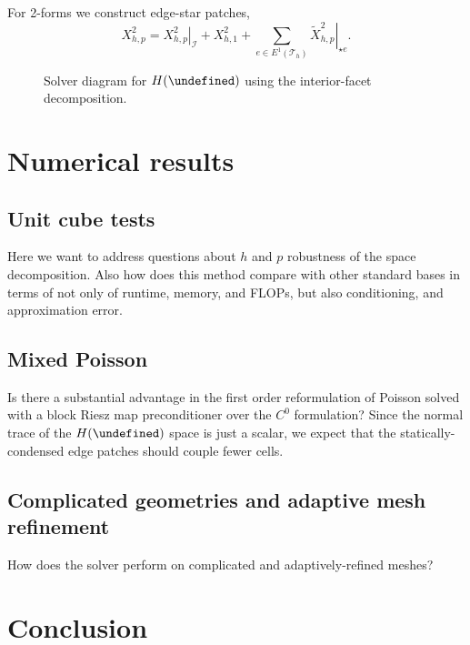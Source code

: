 \documentclass[review,onefignum,onetabnum,a4paper]{siamart190516}
\let\grad\undefined
\let\div\undefined
\DeclareMathOperator{\grad}{grad}
\DeclareMathOperator{\div}{div}
\newcommand{\Hgrad}{H(\grad)}
\newcommand{\Hdiv}{H(\div)}
\newcommand{\mesh}{\mathcal{T}_h}
\begin{document}
For 2-forms we construct edge-star patches,
\begin{equation}
   X^2_{h,p} = \left.X^2_{h,p}\right|_\mathcal{I} +  X^2_{h,1} 
   + \sum_{e\in E^1(\mesh)} \left.\tilde{X}^2_{h,p}\right|_{\star e}. 
\end{equation}



\begin{figure}[htbp]
\footnotesize
\centering
{}
\caption{Solver diagram for $\Hgrad$ using the interior-facet decomposition.}
\end{figure}


\section{Numerical results} \label{sec:results}

\subsection{Unit cube tests}
Here we want to address questions about $h$ and $p$ robustness of the space
decomposition. Also how does this method compare with other standard bases in
terms of not only of runtime, memory, and FLOPs, but also conditioning, and
approximation error.

\subsection{Mixed Poisson}
Is there a substantial advantage in the first order reformulation of Poisson solved
with a block Riesz map preconditioner over the $C^0$ formulation?
Since the normal trace of the $\Hdiv$ space is just a scalar, we expect that the
statically-condensed edge patches should couple fewer cells.


\subsection{Complicated geometries and adaptive mesh refinement}
How does the solver perform on complicated and adaptively-refined meshes?


\section{Conclusion} \label{sec:conclusion}





\end{document}
